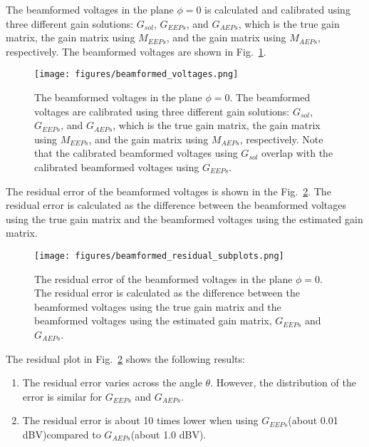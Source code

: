 \documentclass[10pt,a4paper,twocolumn]{paper}
\begin{document}
The beamformed voltages in the plane $\phi =0$ is calculated and calibrated using three different gain solutions: $G_{sol}$, $G_{EEPs}$, and $G_{AEPs}$, which is the true gain matrix, the gain matrix using $M_{EEPs}$, and the gain matrix using $M_{AEPs}$, respectively.
The beamformed voltages are shown in Fig.~\ref{fig:beamformed_voltages}.
\begin{figure}[H]
    \centering
    \texttt{[image: figures/beamformed\_voltages.png]}
    \caption{The beamformed voltages in the plane $\phi = 0$. The beamformed voltages are calibrated using three different gain solutions: $G_{sol}$, $G_{EEPs}$, and $G_{AEPs}$, which is the true gain matrix, the gain matrix using $M_{EEPs}$, and the gain matrix using $M_{AEPs}$, respectively. Note that the calibrated beamformed voltages using $G_{sol}$ overlap with the calibrated beamformed voltages using $G_{EEPs}$.}
    \label{fig:beamformed_voltages}
\end{figure}

The residual error of the beamformed voltages is shown in the Fig.~\ref{fig:beamformed_residual_subplots}. The residual error is calculated as the difference between the beamformed voltages using the true gain matrix and the beamformed voltages using the estimated gain matrix. 

\begin{figure}[H]
    \centering
    \texttt{[image: figures/beamformed\_residual\_subplots.png]}
    \caption{The residual error of the beamformed voltages in the plane $\phi = 0$. The residual error is calculated as the difference between the beamformed voltages using the true gain matrix and the beamformed voltages using the estimated gain matrix, $G_{EEPs}$ and $G_{AEPs}$.}
    \label{fig:beamformed_residual_subplots}
\end{figure}

The residual plot in Fig.~\ref{fig:beamformed_residual_subplots} shows the following results:

\begin{enumerate}
    \item The residual error varies across the angle $\theta$. However, the distribution of the error is similar for $G_{EEPs}$ and $G_{AEPs}$.
    \item The residual error is about 10 times lower when using $G_{EEPs}$(about 0.01 dBV)compared to $G_{AEPs}$(about 1.0 dBV).
\end{enumerate}
\end{document}

